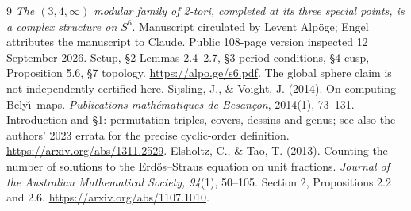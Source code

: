 \begin{thebibliography}{9}
\emph{The $(3,4,\infty)$ modular family of 2-tori, completed at its three
special points, is a complex structure on $S^6$}. Manuscript circulated
by Levent Alp\"oge; Engel attributes the manuscript to Claude.
Public 108-page version inspected 12 September 2026.
Setup, \S2 Lemmas 2.4--2.7, \S3 period conditions, \S4 cusp,
Proposition 5.6, \S7 topology. \url{https://alpo.ge/s6.pdf}.
The global sphere claim is not independently certified here.
Sijsling, J., \& Voight, J. (2014). On computing Bely\u\i\ maps.
\emph{Publications math\'ematiques de Besan\c con}, 2014(1), 73--131.
Introduction and \S1: permutation triples, covers, dessins and genus;
see also the authors' 2023 errata for the precise cyclic-order definition.
\url{https://arxiv.org/abs/1311.2529}.
Elsholtz, C., \& Tao, T. (2013). Counting the number of solutions to the
Erd\H{o}s--Straus equation on unit fractions.
\emph{Journal of the Australian Mathematical Society, 94}(1), 50--105.
Section 2, Propositions 2.2 and 2.6.
\url{https://arxiv.org/abs/1107.1010}.
\end{thebibliography}

